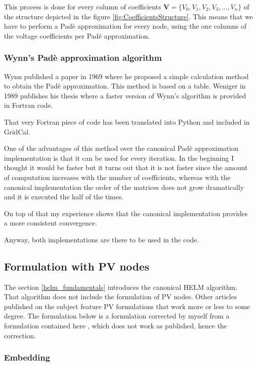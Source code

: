 \documentclass[11pt,fleqn]{book} %
\begin{document}
This process is done for every column of coefficients $\textbf{V}=\{V_0, V_1,V_2,V_3, ...,V_n\}$ of the structure depicted in the figure \ref{fig:CoefficientsStructure}. This means that we have to perform a Padè approximation for every node, using the one columns of the voltage coefficients per Padé approximation.

\subsubsection{Wynn's Padè approximation algorithm}

Wynn published a paper in 1969 where he proposed a simple calculation method to obtain the Padè approximation. This method is based on a table. Weniger in 1989 publishes his thesis where a faster version of Wynn's algorithm is provided in Fortran code. 

That very Fortran piece of code has been translated into Python and included in GridCal.

One of the advantages of this method over the canonical Padè approximation implementation is that it can be used for every iteration. In the beginning I thought it would be faster but it turns out that it is not faster since the amount of computation increases with the number of coefficients, whereas with the canonical implementation the order of the matrices does not grow dramatically and it is executed the half of the times.

On top of that my experience shows that the canonical implementation provides a more consistent convergence.

Anyway, both implementations are there to be used in the code.




\subsection{Formulation with PV nodes}

The section \ref{helm_fundamentals} introduces the canonical HELM algorithm. That algorithm does not include the formulation of PV nodes.
Other articles published on the subject feature PV formulations that work more or less to some degree. The formulation below is a formulation corrected by myself from a formulation contained here \cite{liu2017online}, which does not work as published, hence the correction.



\subsubsection{Embedding}
\end{document}
